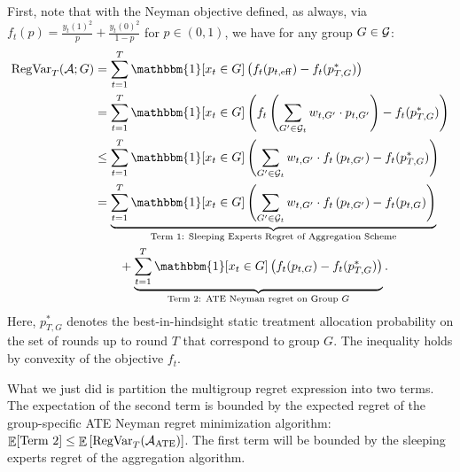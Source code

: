     First, note that with the Neyman objective defined, as always, via $f_t(p) = \frac{y_t(1)^2}{p} + \frac{y_t(0)^2}{1-p}$ for $p \in (0, 1)$, we have for any group $G \in \mathcal{G}$:
    \begin{align*}
        \RegVar_T(\cA; G) &= \sum_{t=1}^T \mathbbm{1}[x_t \in G] \left( f_t(p_{t, \mathrm{eff}}) - f_t(p^*_{T, G}) \right) \\
        &= \sum_{t=1}^T \mathbbm{1}[x_t \in G] \left( f_t \left(\sum_{G' \in \cG_t} w_{t, G'} \cdot p_{t, G'} \right) - f_t(p^*_{T, G}) \right) \\
        &\leq \sum_{t=1}^T \mathbbm{1}[x_t \in G] \left( \sum_{G' \in \cG_t} w_{t, G'} \cdot f_t \left(p_{t, G'} \right) - f_t(p^*_{T, G}) \right) \\
        &= \underbrace{\sum_{t=1}^T \mathbbm{1}[x_t \in G] \left( \sum_{G' \in \cG_t} w_{t, G'} \cdot f_t \left(p_{t, G'} \right) - f_t(p_{t, G}) \right)}_\text{Term 1: Sleeping Experts Regret of Aggregation Scheme}
        \\&\qquad + \underbrace{\sum_{t=1}^T \mathbbm{1}[x_t \in G] \left( f_t(p_{t, G}) - f_t(p^*_{T, G}) \right)}_\text{Term 2: ATE Neyman regret on Group $G$}.
    \end{align*}
    Here, $p^*_{T, G}$ denotes the best-in-hindsight static treatment allocation probability on the set of rounds up to round $T$ that correspond to group $G$. The inequality holds by convexity of the objective $f_t$.

    What we just did is partition the multigroup regret expression into two terms. The expectation of the second term is bounded by the expected regret of the group-specific ATE Neyman regret minimization algorithm: $\mathop{\mathbb{E}}[\text{Term 2}] \leq \mathop{\mathbb{E}} \left[\mathrm{RegVar}_T(\mathcal{A}_\mathrm{ATE}) \right]$. The first term will be bounded by the sleeping experts regret of the aggregation algorithm.  
    
